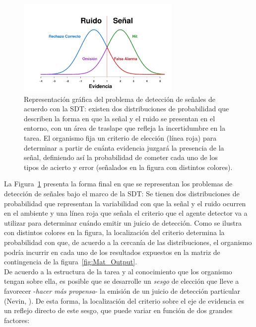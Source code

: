 \begin{figure}[th]
\centering
\includegraphics[width=0.70\textwidth]{Figures/SDT_OutcomesR} 
\caption[Representación gráfica de los posibles Resultados en una Tarea de Detección]{Representación gráfica del problema de detección de señales de acuerdo con la SDT: existen dos distribuciones de probabilidad que describen la forma en que la señal y el ruido se presentan en el entorno, con un área de traslape que refleja la incertidumbre en la tarea. El organismo fija un criterio de elección (línea roja) para determinar a partir de cuánta evidencia juzgará la presencia de la señal, definiendo así la probabilidad de cometer cada uno de los tipos de acierto y error (señalados en la figura con distintos colores).}
\label{fig:Graf_Outputs}
\end{figure}

La Figura~\ref{fig:Graf_Outputs} presenta la forma final en que se representan los problemas de detección de señales bajo el marco de la SDT: Se tienen dos distribuciones de probabilidad que representan la variabilidad con que la señal y el ruido ocurren en el ambiente y una línea roja que señala el criterio que el agente detector va a utilizar para determinar cuándo emitir un juicio de detección. Como se ilustra con distintos colores en la figura, la localización del criterio determina la probabilidad con que, de acuerdo a la cercanía de las distribuciones, el organismo podría incurrir en cada uno de los resultados expuestos en la matriz de contingencia de la figura~\ref{fig:Mat_Output}.\\

De acuerdo a la estructura de la tarea y al conocimiento que los organismo tengan sobre ella, es posible que se desarrolle un \textit{sesgo} de elección que lleve a favorecer -\textit{hacer más propensa}- la emisión de un juicio de detección particular (Nevin, \citeyear{Nevin1969}). De esta forma, la localización del criterio sobre el eje de evidencia es un reflejo directo de este sesgo, que puede variar en función de dos grandes factores:\\

